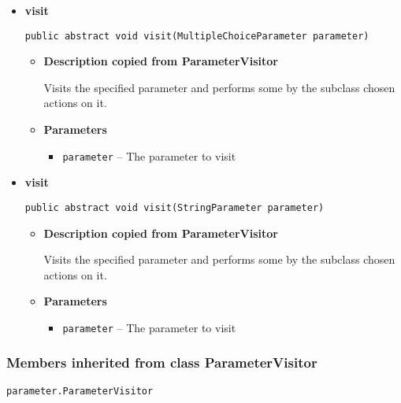 {{{{{{{{{{{{{{\begin{itemize}
{\begin{itemize}
{Visits the specified parameter and performs some by the subclass chosen actions on it.
}
\item{
{\bf  Parameters}
  \begin{itemize}
   \item{
\texttt{parameter} -- The parameter to visit}
  \end{itemize}
}%
\end{itemize}
}%
\item{ 
{\bf  visit}\\
\begin{lstlisting}[frame=none]
public abstract void visit(MultipleChoiceParameter parameter)\end{lstlisting} %
\begin{itemize}
\item{
{\bf  Description copied from ParameterVisitor{\small {}} }

Visits the specified parameter and performs some by the subclass chosen actions on it.
}
\item{
{\bf  Parameters}
  \begin{itemize}
   \item{
\texttt{parameter} -- The parameter to visit}
  \end{itemize}
}%
\end{itemize}
}%
\item{ 
{\bf  visit}\\
\begin{lstlisting}[frame=none]
public abstract void visit(StringParameter parameter)\end{lstlisting} %
\begin{itemize}
\item{
{\bf  Description copied from ParameterVisitor{\small {}} }

Visits the specified parameter and performs some by the subclass chosen actions on it.
}
\item{
{\bf  Parameters}
  \begin{itemize}
   \item{
\texttt{parameter} -- The parameter to visit}
  \end{itemize}
}%
\end{itemize}
}%
\end{itemize}
}
\subsubsection{Members inherited from class ParameterVisitor }{
\texttt{parameter.ParameterVisitor} {\small 
{}}
{\small 

}}}}}}}}}}}}}}}
